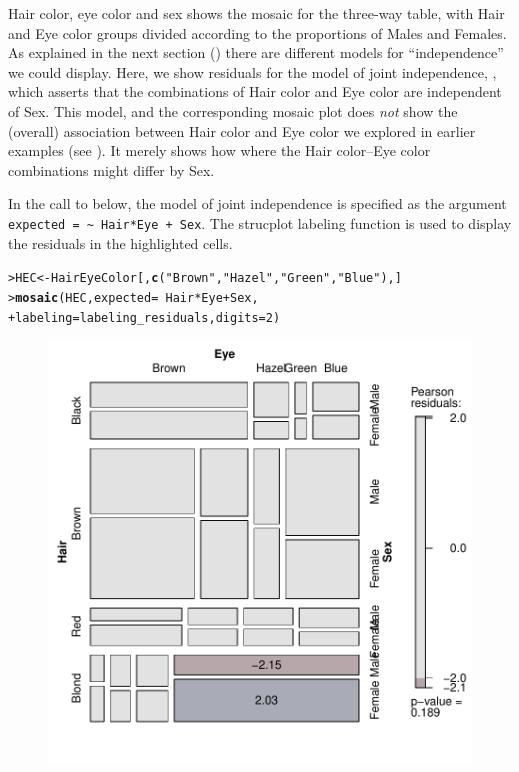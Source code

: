 \documentclass[10pt,krantz2]{krantz}\usepackage[]{graphicx}\usepackage[]{color}
\makeatletter
\newcommand{\hlnum}[1]{\textcolor[rgb]{0.686,0.059,0.569}{#1}}%
\newcommand{\hlstr}[1]{\textcolor[rgb]{0.192,0.494,0.8}{#1}}%
\newcommand{\hlopt}[1]{\textcolor[rgb]{0,0,0}{#1}}%
\newcommand{\hlstd}[1]{\textcolor[rgb]{0.345,0.345,0.345}{#1}}%
\newcommand{\hlkwb}[1]{\textcolor[rgb]{0.69,0.353,0.396}{#1}}%
\newcommand{\hlkwc}[1]{\textcolor[rgb]{0.333,0.667,0.333}{#1}}%
\newcommand{\hlkwd}[1]{\textcolor[rgb]{0.737,0.353,0.396}{\textbf{#1}}}%
\newenvironment{kframe}{%
 \def\at@end@of@kframe{}%
 \ifinner\ifhmode%
  \def\at@end@of@kframe{\end{minipage}}%
  \begin{minipage}{\columnwidth}%
 \fi\fi%
 \def\FrameCommand##1{\hskip\@totalleftmargin \hskip-\fboxsep
 \colorbox{shadecolor}{##1}\hskip-\fboxsep
     \hskip-\linewidth \hskip-\@totalleftmargin \hskip\columnwidth}%
 \MakeFramed {\advance\hsize-\width
   \@totalleftmargin\z@ \linewidth\hsize
   \@setminipage}}%
 {\par\unskip\endMakeFramed%
 \at@end@of@kframe}
\newenvironment{knitrout}{}{} %
\renewenvironment{knitrout}{\small\renewcommand{\baselinestretch}{.85}}{} %
\makeatother
\begin{document}
\begin{Example}[HEC1]{Hair color, eye color and sex}
 shows the mosaic for the three-way table, with Hair and Eye color
groups divided according to the proportions of Males and Females.
As explained in the next section ()
there are different models for
``independence'' we could display.  Here, we show residuals for
the model of joint independence, , which
asserts that the combinations of Hair color and Eye color are
independent of Sex.  This model, and the corresponding mosaic
plot does \emph{not} show the (overall) association between Hair color
and Eye color we explored in earlier examples (see ).  It merely shows how where the Hair color--Eye color
combinations might differ by Sex.

In the call to  below, the model of joint independence
is specified as the argument \verb|expected = ~ Hair*Eye + Sex|.
The strucplot labeling function 
is used to display the residuals in the highlighted cells.
\begin{knitrout}
\color{fgcolor}\begin{kframe}
\begin{alltt}
\hlstd{> }\hlstd{HEC} \hlkwb{<-} \hlstd{HairEyeColor[,} \hlkwd{c}\hlstd{(}\hlstr{"Brown"}\hlstd{,} \hlstr{"Hazel"}\hlstd{,} \hlstr{"Green"}\hlstd{,} \hlstr{"Blue"}\hlstd{),]}
\hlstd{> }\hlkwd{mosaic}\hlstd{(HEC,} \hlkwc{expected} \hlstd{=} \hlopt{~} \hlstd{Hair} \hlopt{*} \hlstd{Eye} \hlopt{+} \hlstd{Sex,}
\hlstd{+ }       \hlkwc{labeling} \hlstd{= labeling_residuals,} \hlkwc{digits} \hlstd{=} \hlnum{2}\hlstd{)}
\end{alltt}
\end{kframe}\begin{figure}[!htb]

\centerline{\includegraphics[width=.7\textwidth]{ch05/fig/HEC-mos1-1} }


\end{figure}
\end{knitrout}
\end{Example}
\end{document}
